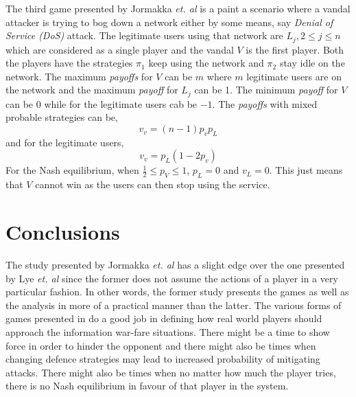 \documentclass[conference]{IEEEtran}
\begin{document}
The third game presented by Jormakka \textit{et. al} \cite{static} is a paint a scenario where a vandal attacker is trying to bog down a network either by some means, say \textit{Denial of Service (DoS)} attack.
The legitimate users using that network are $L_{j}, 2 \le j \le n$ which are considered as a single player and the vandal $V$ is the first player.
Both the players have the strategies $\pi_{1}$ keep using the network and $\pi_{2}$ stay idle on the network.
The maximum \textit{payoffs} for $V$ can be $m$ where $m$ legitimate users are on the network and the maximum \textit{payoff} for $L_{j}$ can be 1.
The minimum \textit{payoff} for $V$ can be $0$ while for the legitimate users cab be $-1$.
The \textit{payoffs} with mixed probable strategies can be,
\begin{equation} \label{pvv}
        v_{v} = (n-1)p_{v}p_{L}
\end{equation}
and for the legitimate users,
\begin{equation} \label{pvl}
        v_{v} = p_{L}(1-2p_{v})
\end{equation}
For the Nash equilibrium, when $\frac{1}{2} \le p_{V} \le 1$, $p_{L} = 0$ and $v_{L} = 0$.
This just means that $V$ cannot win as the users can then stop using the service.

\section*{Conclusions}
The study presented by Jormakka \textit{et. al} \cite{static} has a slight edge over the one presented by Lye \textit{et. al} \cite{stochastic} since the former does not assume the actions of a player in a very particular fashion.
In other words, the former study presents the games as well as the analysis in more of a practical manner than the latter.
The various forms of games presented in \cite{static} do a good job in defining how real world players should approach the information war-fare situations.
There might be a time to show force in order to hinder the opponent and there might also be times when changing defence strategies may lead to increased probability of mitigating attacks.
There might also be times when no matter how much the player tries, there is no Nash equilibrium in favour of that player in the system.

\printbibliography
\end{document}
